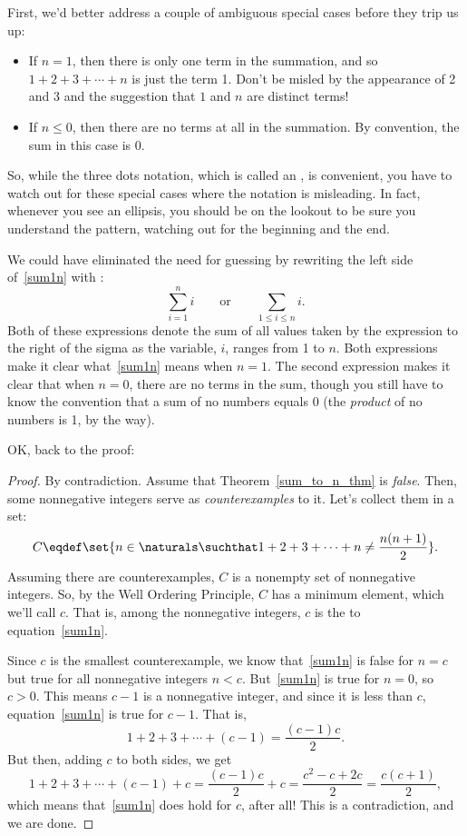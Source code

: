 First, we'd better address a couple of ambiguous special
cases before they trip us up:
\begin{itemize}
\item If $n = 1$, then there is only one term in the summation, and so $1
  + 2 + 3 + \cdots + n$ is just the term 1.  Don't be misled by the
  appearance of 2 and 3 and the suggestion that $1$ and $n$ are distinct
  terms!
\item If $n \leq 0$, then there are no terms at all in the summation.  By
convention, the sum in this case is 0.
\end{itemize}
So, while the three dots notation, which is called an ,
is convenient, you have to watch out for these special cases where the
notation is misleading.  In fact, whenever you see an ellipsis, you
should be on the lookout to be sure you understand the pattern,
watching out for the beginning and the end.

We could have eliminated the need for guessing by rewriting the left side
of~\eqref{sum1n} with :
\[
\sum_{i=1}^n i
\qquad \text{or} \qquad
\sum_{1 \leq i \leq n} i.
\]
Both of these expressions denote the sum of all values taken by the
expression to the right of the sigma as the variable, $i$, ranges from
1 to $n$.  Both expressions make it clear what~\eqref{sum1n} means
when $n=1$.  The second expression makes it clear that when $n=0$,
there are no terms in the sum, though you still have to know the
convention that a sum of no numbers equals 0 (the \emph{product} of no
numbers is 1, by the way).

OK, back to the proof:
\begin{proof}
By contradiction.  Assume that Theorem~\ref{sum_to_n_thm} is
\emph{false}.  Then, some nonnegative integers serve as
\emph{counterexamples} to it. Let's collect them in a set:
\[
C \eqdef \set{n\in\naturals \suchthat 
        1 + 2 + 3 + \cdots + n \neq \frac{n(n+1)}{2}}.
\]
Assuming there are counterexamples, $C$ is a nonempty set of
nonnegative integers.  So, by the Well Ordering Principle, $C$ has a
minimum element, which we'll call $c$.  That is, among the nonnegative
integers, $c$ is the \emph{} to
equation~\eqref{sum1n}.

Since $c$ is the smallest counterexample, we know that~\eqref{sum1n} is
false for $n=c$ but true for all nonnegative integers $n<c$.
But~\eqref{sum1n} is true for $n=0$, so $c > 0$.  This means $c-1$ is a
nonnegative integer, and since it is less than $c$, equation~\eqref{sum1n}
is true for $c-1$.  That is,
\[
        1 + 2 + 3 + \cdots + (c-1) = \frac{(c-1)c}{2}.
\]
But then, adding $c$ to both sides, we get
\[
1 + 2 + 3 + \cdots + (c-1) + c 
        = \frac{(c-1)c}{2} + c
        = \frac{c^2 - c + 2c}{2} 
        = \frac{c(c+1)}{2},
\]
which means that~\eqref{sum1n} does hold for $c$, after all!  This is a
contradiction, and we are done.
\end{proof}


